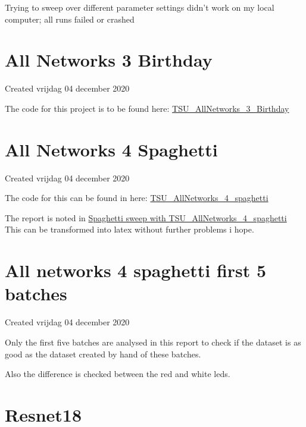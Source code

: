 Trying to sweep over different parameter settings didn't work on my local computer; all runs failed or crashed


		\section{All Networks 3 Birthday}

Created vrijdag 04 december 2020



The code for this project is to be found here: \href{https://colab.research.google.com/drive/1_DKPtHi231TMalsj-uaBLytjcX2DuyV4#scrollTo=vmsTN_T4xoXP}{TSU\_AllNetworks\_3\_Birthday}


		\section{All Networks 4 Spaghetti}

Created vrijdag 04 december 2020



The code for this can be found in here: \href{https://colab.research.google.com/drive/1kKCU9pAsVRqNR-lX1p45Z7BLTxp76CMq}{TSU\_AllNetworks\_4\_spaghetti}





The report is noted in \href{https://wandb.ai/dplars/pytorch-TWI_spaghetti_sweep/reports/Spaghetti-sweep-with-TSU_AllNetworks_4_spaghetti--VmlldzozNTIxNjM}{Spaghetti sweep with TSU\_AllNetworks\_4\_spaghetti} This can be transformed into latex without further problems i hope.


		\section{All networks 4 spaghetti first 5 batches}

Created vrijdag 04 december 2020



Only the first five batches are analysed in this report to check if the dataset is as good as the dataset created by hand of these batches.

Also the difference is checked between the red and white leds.




		
		\section{Resnet18}

